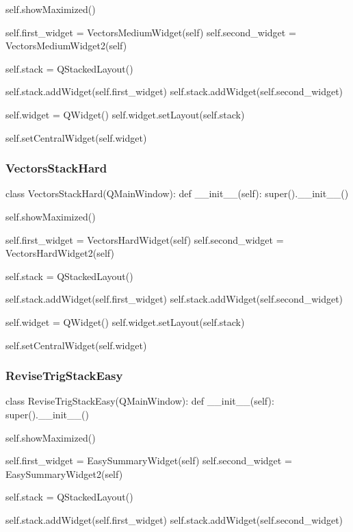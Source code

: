 \begin{landscape}
\begin{python}
        self.showMaximized()

        self.first_widget = VectorsMediumWidget(self)
        self.second_widget = VectorsMediumWidget2(self)

        self.stack = QStackedLayout()

        self.stack.addWidget(self.first_widget)
        self.stack.addWidget(self.second_widget)

        self.widget = QWidget()
        self.widget.setLayout(self.stack)

        self.setCentralWidget(self.widget)
\end{python}

\subsubsection{VectorsStackHard}

\begin{python}
class VectorsStackHard(QMainWindow):
    def __init__(self):
        super().__init__()

        self.showMaximized()

        self.first_widget = VectorsHardWidget(self)
        self.second_widget = VectorsHardWidget2(self)

        self.stack = QStackedLayout()

        self.stack.addWidget(self.first_widget)
        self.stack.addWidget(self.second_widget)

        self.widget = QWidget()
        self.widget.setLayout(self.stack)

        self.setCentralWidget(self.widget)
\end{python}

\subsubsection{ReviseTrigStackEasy}

\begin{python}
class ReviseTrigStackEasy(QMainWindow):
    def __init__(self):
        super().__init__()

        self.showMaximized()

        self.first_widget = EasySummaryWidget(self)
        self.second_widget = EasySummaryWidget2(self)

        self.stack = QStackedLayout()

        self.stack.addWidget(self.first_widget)
        self.stack.addWidget(self.second_widget)


\end{python}
\end{landscape}
